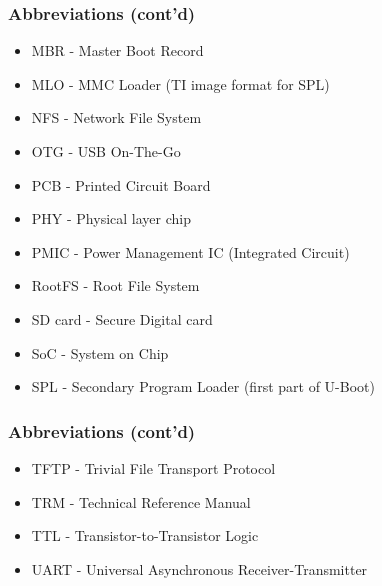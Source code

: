 \documentclass[aspectratio=169]{beamer}
\begin{document}
\begin{frame}
  \frametitle{Abbreviations (cont'd)}
  \begin{itemize}
    \item MBR - Master Boot Record
    \item MLO - MMC Loader (TI image format for SPL)
    \item NFS - Network File System
    \item OTG - USB On-The-Go
    \item PCB - Printed Circuit Board
    \item PHY - Physical layer chip
    \item PMIC - Power Management IC (Integrated Circuit)
    \item RootFS - Root File System
    \item SD card - Secure Digital card
    \item SoC - System on Chip
    \item SPL - Secondary Program Loader (first part of U-Boot)
  \end{itemize}
\end{frame}

\begin{frame}
  \frametitle{Abbreviations (cont'd)}
  \begin{itemize}
    \item TFTP - Trivial File Transport Protocol
    \item TRM - Technical Reference Manual
    \item TTL - Transistor-to-Transistor Logic
    \item UART - Universal Asynchronous Receiver-Transmitter
  \end{itemize}
\end{frame}
\end{document}
